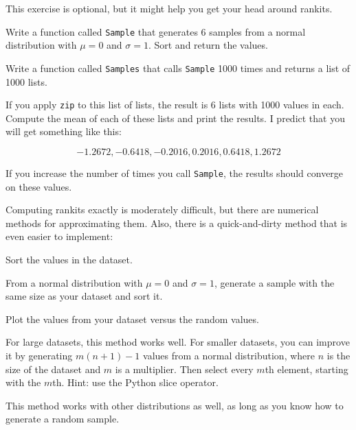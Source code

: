 \documentclass[12pt]{book}
\begin{document}
\begin{ex}
This exercise is optional, but it might help you get your head around rankits.

Write a function called {\tt Sample} that generates 6 samples from a
normal distribution with $\mu = 0$ and $\sigma = 1$.  Sort and return
the values.

Write a function called {\tt Samples} that calls {\tt Sample} 1000 times and
returns a list of 1000 lists.

If you apply {\tt zip} to this list of lists, the result is 6 lists
with 1000 values in each.  Compute the mean of each of these lists
and print the results.  I predict that you will get something like
this:

\[ -1.2672,   -0.6418,   -0.2016,   0.2016,   0.6418,   1.2672 \]

If you increase the number of times you call {\tt Sample}, the
results should converge on these values.

\end{ex}


Computing rankits exactly is moderately difficult, but there are
numerical methods for approximating them.  Also, there is a
quick-and-dirty method that is even easier to implement:

\begin{description}

\item Sort the values in the dataset.

\item From a normal distribution with $\mu = 0$ and $\sigma = 1$,
generate a sample with the same size as your dataset and sort it.

\item Plot the values from your dataset versus the random values.

\end{description}

For large datasets, this method works well.
For smaller datasets, you can improve it by generating $m (n+1) - 1$
values from a normal distribution, where $n$ is the size of the
dataset and $m$ is a multiplier.  Then select every $m$th element,
starting with the $m$th.  Hint: use the Python slice operator.

This method works with other distributions as well, as long as
you know how to generate a random sample.
\end{document}
